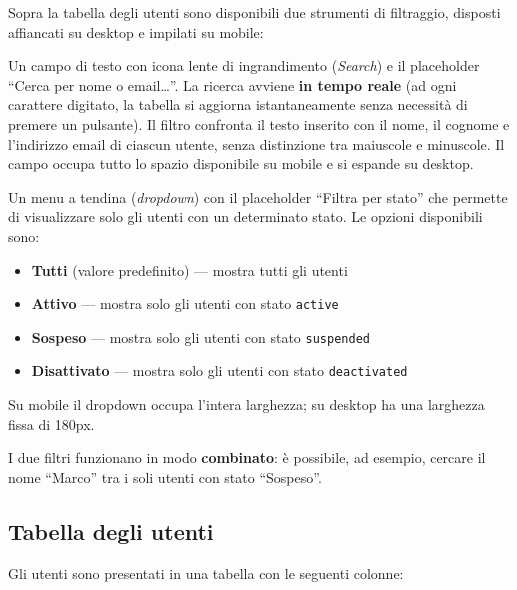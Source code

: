 \documentclass[a4paper,11pt,oneside]{book}
\begin{document}
Sopra la tabella degli utenti sono disponibili due strumenti di filtraggio, disposti affiancati su desktop e impilati su mobile:

\begin{description}[leftmargin=1.5em, style=nextline]
  \item[Campo di ricerca] Un campo di testo con icona lente di ingrandimento (\textit{Search}) e il placeholder ``Cerca per nome o email\ldots''. La ricerca avviene \textbf{in tempo reale} (ad ogni carattere digitato, la tabella si aggiorna istantaneamente senza necessit\`a di premere un pulsante). Il filtro confronta il testo inserito con il nome, il cognome e l'indirizzo email di ciascun utente, senza distinzione tra maiuscole e minuscole. Il campo occupa tutto lo spazio disponibile su mobile e si espande su desktop.

  \item[Filtro per stato] Un menu a tendina (\textit{dropdown}) con il placeholder ``Filtra per stato'' che permette di visualizzare solo gli utenti con un determinato stato. Le opzioni disponibili sono:
    \begin{itemize}
      \item \textbf{Tutti} (valore predefinito) --- mostra tutti gli utenti
      \item \textbf{Attivo} --- mostra solo gli utenti con stato \texttt{active}
      \item \textbf{Sospeso} --- mostra solo gli utenti con stato \texttt{suspended}
      \item \textbf{Disattivato} --- mostra solo gli utenti con stato \texttt{deactivated}
    \end{itemize}
    Su mobile il dropdown occupa l'intera larghezza; su desktop ha una larghezza fissa di 180px.
\end{description}

I due filtri funzionano in modo \textbf{combinato}: \`e possibile, ad esempio, cercare il nome ``Marco'' tra i soli utenti con stato ``Sospeso''.

\subsection{Tabella degli utenti}

Gli utenti sono presentati in una tabella con le seguenti colonne:
\end{document}
